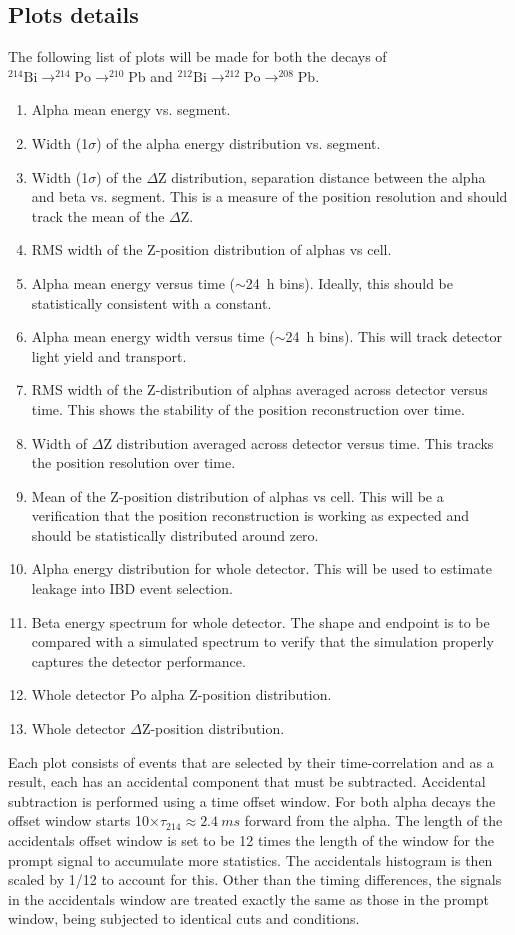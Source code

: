 \subsection{Plots details}
The following list of plots will be made for both the decays of $^{214}\textrm{Bi}\rightarrow^{214}\textrm{Po}\rightarrow^{210}\textrm{Pb}$ and $^{212}\textrm{Bi}\rightarrow^{212}\textrm{Po}\rightarrow^{208}\textrm{Pb}$.
\begin{enumerate}
\item{Alpha mean energy vs. segment.}
\item{Width (1$\sigma$) of the alpha energy distribution vs. segment.}
\item{Width (1$\sigma$) of the $\Delta$Z distribution, separation distance between the alpha and beta vs. segment. This is a measure of the position resolution and should track the mean of the $\Delta$Z.}
\item{RMS width of the Z-position distribution of alphas vs cell.}
\item{Alpha mean energy versus time ($\sim$24~h bins). Ideally, this should be statistically consistent with a constant.}
\item{Alpha mean energy width versus time ($\sim$24~h bins). This will track detector light yield and transport.}
\item{RMS width of the Z-distribution of alphas averaged across detector versus time. This shows the stability of the position reconstruction over time.}
\item{Width of $\Delta$Z distribution averaged across detector versus time. This tracks the position resolution over time.}
\item{Mean of the Z-position distribution of alphas vs cell. This will be a verification that the position reconstruction is working as expected and should be statistically distributed around zero.}
\item{Alpha energy distribution for whole detector. This will be used to estimate leakage into IBD event selection.}
\item{Beta energy spectrum for whole detector. The shape and endpoint is to be compared with a simulated spectrum to verify that the simulation properly captures the detector performance. }
\item{Whole detector Po alpha Z-position distribution.}
\item{Whole detector $\Delta$Z-position distribution.}
\end{enumerate}
Each plot consists of events that are selected by their time-correlation and as a result, each has an accidental component that must be subtracted. Accidental subtraction is performed using a time offset window. For both alpha decays the offset window starts 10$\times\tau_{214}\approx2.4~ms$ forward from the alpha. The length of the accidentals offset window is set to be 12 times the length of the window for the prompt signal to accumulate more statistics. The accidentals histogram is then scaled by 1/12 to account for this. Other than the timing differences, the signals in the accidentals window are treated exactly the same as those in the prompt window, being subjected to identical cuts and conditions.

